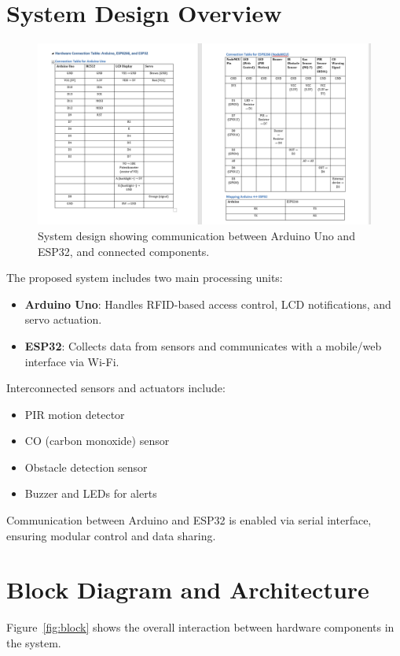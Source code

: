 \documentclass[conference, onecolumn]{IEEEtran}
\begin{document}
\section{System Design Overview}

\begin{figure}[H]
    \centering
    \includegraphics[width=0.8\linewidth]{Table.png} 
    \caption{System design showing communication between Arduino Uno and ESP32, and connected components.}
    \label{fig:system_overview}
\end{figure}

The proposed system includes two main processing units:
\begin{itemize}
    \item \textbf{Arduino Uno}: Handles RFID-based access control, LCD notifications, and servo actuation.
    \item \textbf{ESP32}: Collects data from sensors and communicates with a mobile/web interface via Wi-Fi.
\end{itemize}

Interconnected sensors and actuators include:
\begin{itemize}
    \item PIR motion detector
    \item CO (carbon monoxide) sensor
    \item Obstacle detection sensor
    \item Buzzer and LEDs for alerts
\end{itemize}

Communication between Arduino and ESP32 is enabled via serial interface, ensuring modular control and data sharing.

\section{Block Diagram and Architecture}
Figure~\ref{fig:block} shows the overall interaction between hardware components in the system.
\end{document}

